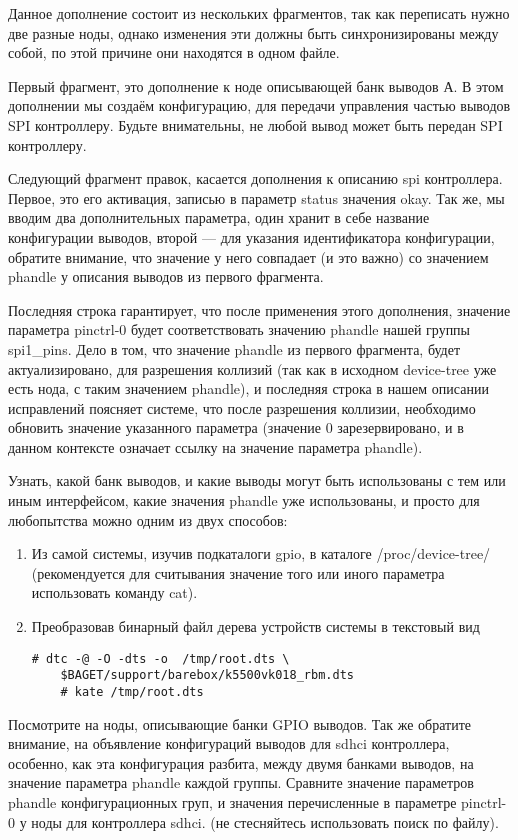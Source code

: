 Данное дополнение состоит из нескольких фрагментов, так как переписать нужно две разные ноды, однако изменения эти должны быть синхронизированы между собой, по этой причине они находятся в одном файле. 

Первый фрагмент, это дополнение к ноде описывающей банк выводов А. В этом дополнении мы создаём конфигурацию, для передачи управления частью выводов SPI контроллеру. Будьте внимательны, не любой вывод может быть передан SPI контроллеру. 

Следующий фрагмент правок, касается дополнения к описанию spi контроллера. Первое, это его активация, записью в параметр status значения okay. Так же, мы вводим два дополнительных параметра, один хранит в себе название конфигурации выводов, второй — для указания идентификатора конфигурации, обратите внимание, что значение у него совпадает (и это важно) со значением phandle у описания выводов из первого фрагмента.

Последняя строка гарантирует, что после применения этого дополнения, значение параметра pinctrl-0 будет соответствовать значению phandle нашей группы spi1\_pins. Дело в том, что значение phandle из первого фрагмента, будет  актуализировано, для разрешения коллизий (так как в исходном device-tree уже есть нода, с таким значением phandle), и последняя строка в нашем описании исправлений поясняет системе, что после разрешения коллизии, необходимо обновить значение указанного параметра (значение 0 зарезервировано, и в данном контексте означает ссылку на значение параметра phandle).  

Узнать, какой банк выводов, и какие выводы могут быть использованы с тем или иным интерфейсом, какие значения phandle уже использованы, и просто для любопытства можно одним из двух способов:

\begin{enumerate}
	\item Из самой системы, изучив подкаталоги gpio, в каталоге /proc/device-tree/ (рекомендуется для считывания значение того или иного параметра использовать команду cat). 
	
	\item Преобразовав бинарный файл дерева устройств системы в текстовый вид 
	\begin{lstlisting}[style=bash]
	# dtc -@ -O -dts -o  /tmp/root.dts \
	$BAGET/support/barebox/k5500vk018_rbm.dts
	# kate /tmp/root.dts
	\end{lstlisting}
\end{enumerate}

Посмотрите на ноды, описывающие банки GPIO выводов. Так же обратите внимание, на объявление конфигураций выводов для sdhci контроллера, особенно, как эта конфигурация разбита, между двумя банками выводов, на значение параметра phandle каждой группы. Сравните значение параметров phandle конфигурационных груп, и значения перечисленные в параметре pinctrl-0 у ноды для контроллера  sdhci. (не стесняйтесь использовать поиск по файлу).

